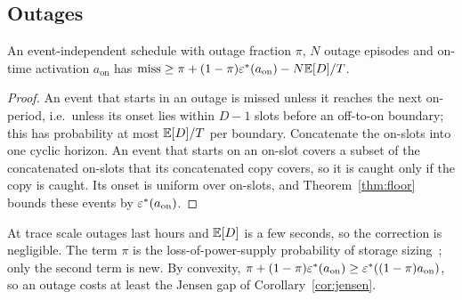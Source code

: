 \subsection{Outages}\label{sec:blackout}
\begin{proposition}[Blackout]\label{prop:blackout}
An event-independent schedule with outage fraction $\pi$, $N$ outage episodes and on-time activation $a_{\mathrm{on}}$ has $\mathrm{miss}\ge\pi+(1-\pi)\varepsilon^*(a_{\mathrm{on}})-N\mathbb{E}[D]/T$.
\end{proposition}
\begin{proof}
An event that starts in an outage is missed unless it reaches the next on-period, i.e.\ unless its onset lies within $D-1$ slots before an off-to-on boundary; this has probability at most $\mathbb{E}[D]/T$ per boundary. Concatenate the on-slots into one cyclic horizon. An event that starts on an on-slot covers a subset of the concatenated on-slots that its concatenated copy covers, so it is caught only if the copy is caught. Its onset is uniform over on-slots, and Theorem~\ref{thm:floor} bounds these events by $\varepsilon^*(a_{\mathrm{on}})$.
\end{proof}
\noindent At trace scale outages last hours and $\mathbb{E}[D]$ is a few seconds, so the correction is negligible. The term $\pi$ is the loss-of-power-supply probability of storage sizing~\cite{borowy1996lpsp}; only the second term is new. By convexity, $\pi+(1-\pi)\varepsilon^*(a_{\mathrm{on}})\ge\varepsilon^*((1-\pi)a_{\mathrm{on}})$, so an outage costs at least the Jensen gap of Corollary~\ref{cor:jensen}.


